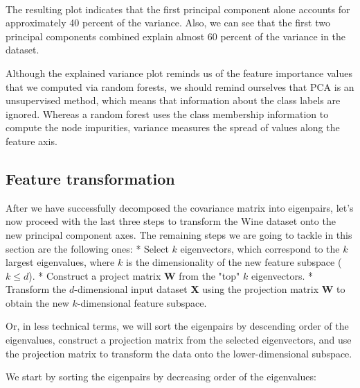 \documentclass[11pt]{article}
\begin{document}
    \begin{center}
    \end{center}
    { \hspace*{\fill} \\}
    
    The resulting plot indicates that the first principal component alone
accounts for approximately 40 percent of the variance. Also, we can see
that the first two principal components combined explain almost 60
percent of the variance in the dataset.

Although the explained variance plot reminds us of the feature
importance values that we computed via random forests, we should remind
ourselves that PCA is an unsupervised method, which means that
information about the class labels are ignored. Whereas a random forest
uses the class membership information to compute the node impurities,
variance measures the spread of values along the feature axis.

    \subsection{Feature transformation}\label{feature-transformation}

    After we have successfully decomposed the covariance matrix into
eigenpairs, let's now proceed with the last three steps to transform the
Wine dataset onto the new principal component axes. The remaining steps
we are going to tackle in this section are the following ones: * Select
\(k\) eigenvectors, which correspond to the \(k\) largest eigenvalues,
where \(k\) is the dimensionality of the new feature subspace
(\(k \le d\)). * Construct a project matrix \textbf{W} from the "top"
\(k\) eigenvectors. * Transform the \(d\)-dimensional input dataset
\textbf{X} using the projection matrix \textbf{W} to obtain the new
\(k\)-dimensional feature subspace.

Or, in less technical terms, we will sort the eigenpairs by descending
order of the eigenvalues, construct a projection matrix from the
selected eigenvectors, and use the projection matrix to transform the
data onto the lower-dimensional subspace.

We start by sorting the eigenpairs by decreasing order of the
eigenvalues:
\end{document}
